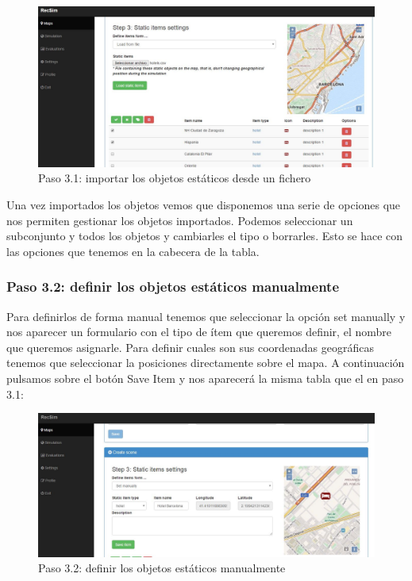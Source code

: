 \begin{figure}[H]
	\centering\includegraphics[scale=0.35]{imagenes/capitulo9/crear-escena-3.JPG}
	\caption{Paso 3.1: importar los objetos estáticos desde un fichero}
	\label{img:paso3-1}
\end{figure}

Una vez importados los objetos vemos que disponemos una serie de opciones que nos permiten gestionar los objetos importados. Podemos seleccionar un subconjunto y todos los objetos y cambiarles el tipo o borrarles. Esto se hace con las opciones que tenemos en la cabecera de la tabla.

\subsubsection{Paso 3.2: definir los objetos estáticos manualmente}

Para definirlos de forma manual tenemos que seleccionar la opción set manually y nos aparecer un formulario con el tipo de ítem que queremos definir, el nombre que queremos asignarle. Para definir cuales son sus coordenadas geográficas tenemos que seleccionar la posiciones directamente sobre el mapa. A continuación pulsamos sobre el botón Save Item y nos aparecerá la misma tabla que el en paso 3.1:

\begin{figure}[H]
	\centering\includegraphics[scale=0.35]{imagenes/capitulo9/crear-escena-4.JPG}
	\caption{Paso 3.2:  definir los objetos estáticos manualmente}
	\label{img:paso3-2}
\end{figure}

